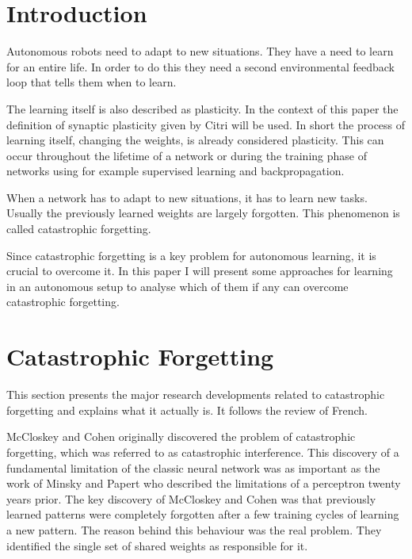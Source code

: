 \documentclass[12pt,twoside]{scrartcl}
\theoremstyle{plain}
\theoremstyle{definition}
\theoremstyle{remark}
\begin{document}
\setcounter{tocdepth}{2} 					%
\tableofcontents
{}
\clearpage



\section{Introduction}
\label{sec:introduction}

Autonomous robots need to adapt to new situations. They have a need to learn
for an entire life. In order to do this they need a second environmental feedback
loop that tells them when to learn.\cite{Toutounji2016}

The learning itself is also described as plasticity. In the context of this paper
the definition of synaptic plasticity given by Citri\cite{Citri2008} will be used.
In short the process of learning itself, changing the weights, is already
considered plasticity. This can occur throughout the lifetime of a network or
during the training phase of networks using for example supervised learning
and backpropagation.

When a network has to adapt to new situations, it has to learn new tasks. Usually
the previously learned weights are largely forgotten. This phenomenon is called
catastrophic forgetting.\cite{French1999,McCloskey1989}

Since catastrophic forgetting is a key problem for autonomous learning, it is
crucial to overcome it. In this paper I will present some approaches for
learning in an autonomous setup to analyse which of them if any can overcome
catastrophic forgetting.

\section{Catastrophic Forgetting}
\label{sec:catastrophicforgetting}

This section presents the major research developments related to catastrophic
forgetting and explains what it actually is. It follows the review of French\cite{French1999}.

McCloskey and Cohen\cite{McCloskey1989} originally discovered the problem of
catastrophic forgetting, which was referred to as catastrophic interference. This
discovery of a fundamental limitation of the classic neural network was as
important as the work of Minsky and Papert\cite{Minsky1969} who described the
limitations of a perceptron twenty years prior. The key discovery of McCloskey
and Cohen was that previously learned patterns were completely forgotten after
a few training cycles of learning a new pattern. The reason behind this
behaviour was the real problem. They identified the single set of shared
weights as responsible for it.
\end{document}
